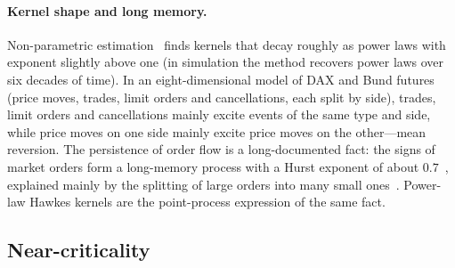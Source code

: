 \paragraph{Kernel shape and long memory.} Non-parametric estimation~\citep{bacry2016} finds kernels
that decay roughly as power laws with exponent slightly above one (in simulation the method recovers
power laws over six decades of time). In
an eight-dimensional model of DAX and Bund futures (price moves, trades, limit orders and
cancellations, each split by side), trades, limit orders and cancellations mainly excite events of
the same type and side, while price moves on one side mainly excite price moves on the other---mean
reversion. The persistence of order flow is a long-documented fact: the signs of market orders form a
long-memory process with a Hurst exponent of about $0.7$~\citep{lillo2004}, explained mainly by the
splitting of large orders into many small ones~\citep{lillo2005,bouchaud2009}. Power-law Hawkes
kernels are the point-process expression of the same fact.

\subsection{Near-criticality}
\label{sec:hawkes-crit}

